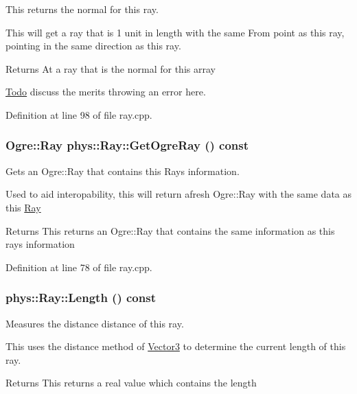 This returns the normal for this ray. 

This will get a ray that is 1 unit in length with the same From point as this ray, pointing in the same direction as this ray. \begin{DoxyReturn}{Returns}
At a ray that is the normal for this array 
\end{DoxyReturn}


\begin{Desc}
\item[\hyperlink{todo__todo000020}{Todo}]discuss the merits throwing an error here. \end{Desc}




Definition at line 98 of file ray.cpp.

\hypertarget{classphys_1_1Ray_a0c29b1a55f42ff60d224f16cc0910cdb}{
\subsubsection[{GetOgreRay}]{\setlength{\rightskip}{0pt plus 5cm}Ogre::Ray phys::Ray::GetOgreRay () const}}
\label{df/d57/classphys_1_1Ray_a0c29b1a55f42ff60d224f16cc0910cdb}


Gets an Ogre::Ray that contains this Rays information. 

Used to aid interopability, this will return afresh Ogre::Ray with the same data as this \hyperlink{classphys_1_1Ray}{Ray} \begin{DoxyReturn}{Returns}
This returns an Ogre::Ray that contains the same information as this rays information 
\end{DoxyReturn}


Definition at line 78 of file ray.cpp.

\hypertarget{classphys_1_1Ray_add544025fcd6d1cdcfed3c0413b3701b}{
\subsubsection[{Length}]{ phys::Ray::Length () const}}
\label{df/d57/classphys_1_1Ray_add544025fcd6d1cdcfed3c0413b3701b}


Measures the distance distance of this ray. 

This uses the distance method of \hyperlink{classphys_1_1Vector3}{Vector3} to determine the current length of this ray. \begin{DoxyReturn}{Returns}
This returns a real value which contains the length 
\end{DoxyReturn}


